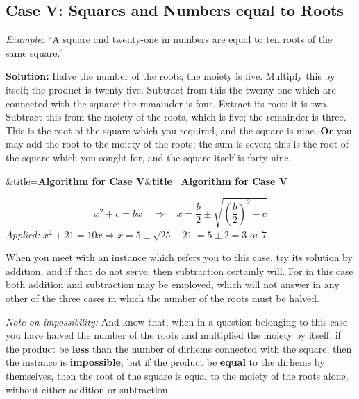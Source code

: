 \documentclass[11pt,a4paper]{book}
\newcommand{\cnote}[1]{\textcolor{notecolor}{\textit{#1}}}
\newenvironment{mathbox}[1][]{%
  \smallskip\par\noindent
  \begin{lrbox}{\mathboxsave}
  \begin{minipage}{\dimexpr\linewidth-2\fboxsep-2\fboxrule\relax}%
  \setlength{\parskip}{0.3em}%
  \ifx&#1&\else\textbf{#1}\\[0.2cm]\fi
}{%
  \end{minipage}%
  \end{lrbox}
  \fcolorbox{sectioncolor}{mathbg}{\usebox{\mathboxsave}}%
  \smallskip}
\begin{document}
\begin{minipage}[t]{0.48\textwidth}
\raggedright

\subsection*{Case V: Squares and Numbers equal to Roots}

\textit{Example:} ``A square and twenty-one in numbers are equal to ten roots of the same square.''

\textbf{Solution:} Halve the number of the roots; the moiety is five. Multiply this by itself; the product is twenty-five. Subtract from this the twenty-one which are connected with the square; the remainder is four. Extract its root; it is two. Subtract this from the moiety of the roots, which is five; the remainder is three. This is the root of the square which you required, and the square is nine. \textbf{Or} you may add the root to the moiety of the roots; the sum is seven; this is the root of the square which you sought for, and the square itself is forty-nine.

\begin{mathbox}[title={\textbf{Algorithm for Case V}}]
\begin{equation}
x^2 + c = bx \quad\Longrightarrow\quad x = \frac{b}{2} \pm \sqrt{\left(\frac{b}{2}\right)^2 - c}
\end{equation}
\textit{Applied:} $x^2 + 21 = 10x \Rightarrow x = 5 \pm \sqrt{25 - 21} = 5 \pm 2 = 3 \text{ or } 7$
\end{mathbox}

When you meet with an instance which refers you to this case, try its solution by addition, and if that do not serve, then subtraction certainly will. For in this case both addition and subtraction may be employed, which will not answer in any other of the three cases in which the number of the roots must be halved.

\cnote{Note on impossibility:} And know that, when in a question belonging to this case you have halved the number of the roots and multiplied the moiety by itself, if the product be \textbf{less} than the number of dirhems connected with the square, then the instance is \textbf{impossible}; but if the product be \textbf{equal} to the dirhems by themselves, then the root of the square is equal to the moiety of the roots alone, without either addition or subtraction.

\end{minipage}
\vspace{0.3cm}
\end{document}
